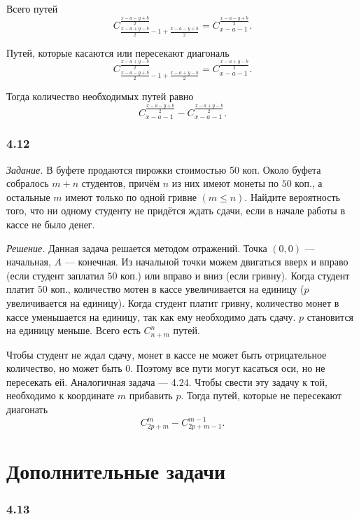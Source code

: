 \begin{enumerate}[label=\alph*)]
Всего путей
$$C_{ \frac{x-a+y-b}{2} - 1 + \frac{x-a-y+b}{2} }^{ \frac{x-a-y+b}{2} } =
C_{x-a-1}^{ \frac{x-a-y+b}{2} }.$$

Путей, которые касаются или пересекают диагональ
$$C_{ \frac{x-a-y+b}{2} - 1 + \frac{x-a+y-b}{2}}^{ \frac{x-a+y-b}{2} } =
C_{x-a-1}^{ \frac{x-a+y-b}{2} }.$$

Тогда количество необходимых путей равно
$$C_{x-a-1}^{ \frac{x-a-y+b}{2} } - C_{x-a-1}^{ \frac{x-a+y-b}{2} }.$$
\end{enumerate}

\subsubsection*{4.12}

\textit{Задание.} В буфете продаются пирожки стоимостью 50 коп.
Около буфета собралось $m+n$ студентов,
причём $n$ из них имеют монеты по $50$ коп., а остальные $m$ имеют только по одной гривне $ \left( m \leq n \right) $.
Найдите вероятность того, что ни одному студенту не придётся ждать сдачи, если в начале работы в кассе не было денег.

\textit{Решение.} Данная задача решается методом отражений.
Точка $ \left( 0, 0 \right) $ --- начальная, $A$ --- конечная.
Из начальной точки можем двигаться вверх и вправо (если студент заплатил $50$ коп.) или вправо и вниз (если гривну).
Когда студент платит $50$ коп., количество мотен в кассе увеличивается на единицу ($p$ увеличивается на единицу).
Когда студент платит гривну, количество монет в кассе уменьшается на единицу, так как ему необходимо дать сдачу.
$p$ становится на единицу меньше.
Всего есть $C_{n+m}^n$ путей.

Чтобы студент не ждал сдачу, монет в кассе не может быть отрицательное количество, но может быть 0.
Поэтому все пути могут касаться оси, но не пересекать ей.
Аналогичная задача --- 4.24.
Чтобы свести эту задачу к той, необходимо к координате $m$ прибавить $p$.
Тогда путей, которые не пересекают диагонать
$$C_{2p+m}^m - C_{2p+m-1}^{m-1}.$$

\section*{Дополнительные задачи}

\subsubsection*{4.13}

